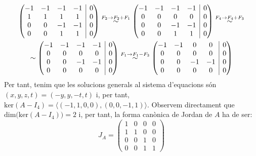 \documentclass[11pt,a4paper]{article}
\newcommand{\rvline}{\hspace*{-\arraycolsep}\vline\hspace*{-\arraycolsep}}
\begin{document}
        \begin{multline*}
                \begin{pmatrix}
                -1 & -1 & -1 & -1 & \rvline & 0\\
                1 & 1 & 1 & 1 & \rvline & 0\\
                0 & 0 & -1 & -1 & \rvline & 0\\
                0 & 0 & 1 & 1 & \rvline & 0
                \end{pmatrix}\stackrel{F_2\rightarrow F_2+F_1}{\sim}\begin{pmatrix}
                -1 & -1 & -1 & -1 & \rvline & 0\\
                0 & 0 & 0 & 0 & \rvline & 0\\
                0 & 0 & -1 & -1 & \rvline & 0\\
                0 & 0 & 1 & 1 & \rvline & 0
            \end{pmatrix}\stackrel{F_4\rightarrow F_4+F_3}{\sim}\\\sim\begin{pmatrix}
                -1 & -1 & -1 & -1 & \rvline & 0\\
                0 & 0 & 0 & 0 & \rvline & 0\\
                0 & 0 & -1 & -1 & \rvline & 0\\
                0 & 0 & 0 & 0 & \rvline & 0
            \end{pmatrix}\stackrel{F_1\rightarrow F_1-F_3}{\sim}\begin{pmatrix}
                -1 & -1 & 0 & 0 & \rvline & 0\\
                0 & 0 & 0 & 0 & \rvline & 0\\
                0 & 0 & -1 & -1 & \rvline & 0\\
                0 & 0 & 0 & 0 & \rvline & 0
            \end{pmatrix}
        \end{multline*}
        Per tant, tenim que les solucions generals al sistema d'equacions són $(x,y,z,t)=(-y,y,-t,t)$ i, per tant, $\text{ker}(A-I_4)=\langle(-1,1,0,0),(0,0,-1,1)\rangle$. Observem directament que $\text{dim(ker}(A-I_4))=2$ i, per tant, la forma canònica de Jordan de $A$ ha de ser:
        \begin{equation*}
            J_A=\begin{pmatrix}
            1 & 0 & 0 & 0\\
            1 & 1 & 0 & 0\\
            0 & 0 & 1 & 0\\
            0 & 0 & 1 & 1
            \end{pmatrix}
        \end{equation*}
\end{document}
